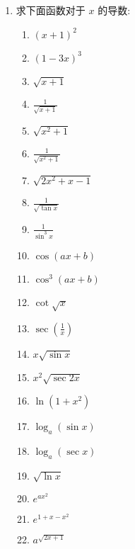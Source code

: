 \begin{ex}
\begin{enumerate}
    \item 求下面函数对于 $x$ 的导数:
\begin{multicols}{2}
\begin{enumerate}
    \item $(x+1)^{2} $ 
\item $(1-3 x)^{3} $
\item  $\sqrt{x+1}$
\item  $\frac{1}{\sqrt{x+1}}$
\item  $\sqrt{x^{2}+1}$
\item  $\frac{1}{\sqrt{x^{2}+1}}$
\item  $\sqrt{2 x^{2}+x-1}$
\item  $\frac{1}{\sqrt{\tan x}}$
\item  $\frac{1}{\sin ^{3} x} $
\item  $\cos (a x+b)$
\item  $\cos ^{3}(a x+b) $
\item  $\cot \sqrt{x} $
\item  $\sec \left(\frac{1}{x}\right)$
\item  $x \sqrt{\sin x}$
\item  $x^{2} \sqrt{\sec 2x}$
\item  $\ln \left(1+x^{2}\right)$
\item $\log _{a}(\sin x)$
\item $\log _{a}(\sec x)$
\item  $\sqrt{\ln x}$
\item $e^{a x^{2}}$
\item $e^{1+x-x^{2}}$
\item  $a^{\sqrt{2x+1}}$
\end{enumerate}
\end{multicols}


\end{enumerate}
\end{ex}
